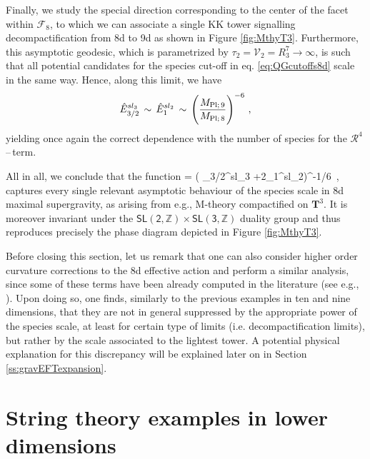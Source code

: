 Finally, we study the special direction corresponding to the center of the facet within $\mathscr{F}_8$, to which we can associate a single KK tower signalling decompactification from 8d to 9d as shown in Figure \ref{fig:MthyT3}. Furthermore, this asymptotic geodesic, which is parametrized by $\tau_2=\mathcal{V}_2=R_3^7 \to \infty$, is such that all potential candidates for the species cut-off in eq. \eqref{eq:QGcutoffs8d} scale in the same way. Hence, along this limit, we have 
%
\begin{equation}
   \hat{E}_{3/2}^{sl_3}\, \sim\, \hat{E}_{1}^{sl_2}\, \sim\,  \left(\frac{M_{\rm Pl;\, 9}}{M_{\rm Pl;\, 8}}\right)^{-6} \, ,
\end{equation}
%
yielding once again the correct dependence with the number of species for the $\mathcal{R}^4$--\,term.

All in all, we conclude that the function 
%
\beq
\LSP = \left( _{3/2}^{sl_3} +2_{1}^{sl_2}\right)^{-1/6}\, ,
\label{eq:8dfullspeciesfn}
\eeq
%
captures every single relevant asymptotic behaviour of the species scale in 8d maximal supergravity, as arising from e.g., M-theory compactified on $\mathbf{T}^3$. It is moreover invariant under the $\mathsf{SL(2,\mathbb{Z})}\times \mathsf{SL(3,\mathbb{Z})}$ duality group and thus reproduces precisely the phase diagram depicted in Figure \ref{fig:MthyT3}.

Before closing this section, let us remark that one can also consider higher order curvature corrections to the 8d effective action and perform a similar analysis, since some of these terms have been already computed in the literature (see e.g., \cite{Green:2010wi}). Upon doing so, one finds, similarly to the previous examples in ten and nine dimensions, that they are not in general suppressed by the appropriate power of the species scale, at least for certain type of limits (i.e. decompactification limits), but rather by the scale associated to the lightest tower. A potential physical explanation for this discrepancy will be explained later on in Section \ref{ss:gravEFTexpansion}. %


\section{String theory examples in lower dimensions}
\label{s:4dN=2}

